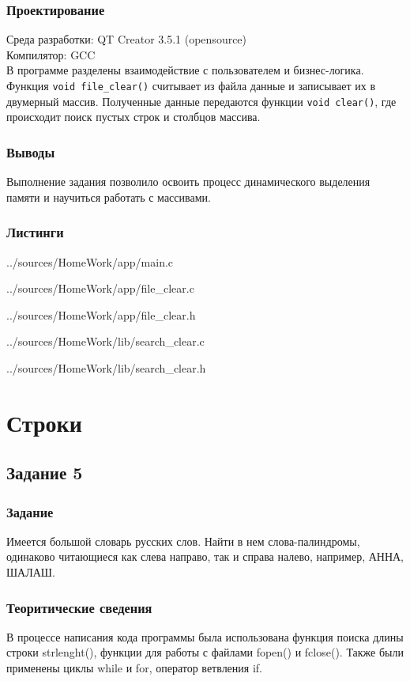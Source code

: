 \documentclass[12pt,a4paper]{report}
\begin{document}
\subsection{Проектирование}
Среда разработки: QT Creator 3.5.1 (opensource)
\\
Компилятор: GCC
\\
В программе разделены взаимодействие с пользователем и бизнес-логика. Функция \verb+void file_clear()+ считывает из файла данные и записывает их в двумерный массив. Полученные данные передаются функции \verb+void clear()+, где происходит поиск пустых строк и столбцов массива.

\subsection{Выводы}
Выполнение задания позволило освоить процесс динамического выделения памяти и научиться работать с массивами.

\subsection*{Листинги}

{../sources/HomeWork/app/main.c}


{../sources/HomeWork/app/file_clear.c}


{../sources/HomeWork/app/file_clear.h}


{../sources/HomeWork/lib/search_clear.c}


{../sources/HomeWork/lib/search_clear.h}


\chapter{Строки}
\section{Задание 5}
\subsection{Задание}
Имеется большой словарь русских слов. Найти в нем слова-палиндромы, одинаково читающиеся как слева направо, так и справа налево, например, АННА, ШАЛАШ.

\subsection{Теоритические сведения}
В процессе написания кода программы была использована функция поиска длины строки strlenght(), функции для работы с файлами fopen() и fclose(). Также были применены циклы while и for, оператор ветвления if. 
  
\end{document}
